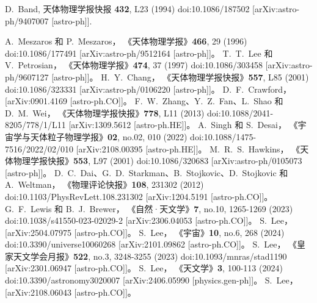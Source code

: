 \documentclass[jkps,preprint,fleqn]{revtex4}
\begin{document}
\begin{CJK*}{UTF8}{gbsn}
\begin{thebibliography}{999}
D.~Band,  
天体物理学报快报 \textbf{432}, L23 (1994)  
doi:10.1086/187502  
[arXiv:astro-ph/9407007 [astro-ph]].  

A.~Meszaros 和 P.~Meszaros，
《天体物理学报》\textbf{466}, 29 (1996)
doi:10.1086/177491
[arXiv:astro-ph/9512164 [astro-ph]]。
T.~T.~Lee 和 V.~Petrosian，
《天体物理学报》\textbf{474}, 37 (1997)
doi:10.1086/303458
[arXiv:astro-ph/9607127 [astro-ph]]。
H.~Y.~Chang，
《天体物理学报快报》\textbf{557}, L85 (2001)
doi:10.1086/323331
[arXiv:astro-ph/0106220 [astro-ph]]。
D.~F.~Crawford，
[arXiv:0901.4169 [astro-ph.CO]]。
F.~W.~Zhang、Y.~Z.~Fan、L.~Shao 和 D.~M.~Wei，
《天体物理学报快报》\textbf{778}, L11 (2013)
doi:10.1088/2041-8205/778/1/L11
[arXiv:1309.5612 [astro-ph.HE]]。
A.~Singh 和 S.~Desai，
《宇宙学与天体粒子物理学报》\textbf{02}, no.02, 010 (2022)
doi:10.1088/1475-7516/2022/02/010
[arXiv:2108.00395 [astro-ph.HE]]。
M.~R.~S.~Hawkins，
《天体物理学报快报》\textbf{553}, L97 (2001)
doi:10.1086/320683
[arXiv:astro-ph/0105073 [astro-ph]]。
D.~C.~Dai、G.~D.~Starkman、B.~Stojkovic、D.~Stojkovic 和 A.~Weltman，
《物理评论快报》\textbf{108}, 231302 (2012)
doi:10.1103/PhysRevLett.108.231302
[arXiv:1204.5191 [astro-ph.CO]]。
G.~F.~Lewis 和 B.~J.~Brewer，
《自然·天文学》\textbf{7}, no.10, 1265-1269 (2023)
doi:10.1038/s41550-023-02029-2
[arXiv:2306.04053 [astro-ph.CO]]。
S.~Lee，
[arXiv:2504.07975 [astro-ph.CO]]。
S.~Lee，
《宇宙》\textbf{10}, no.6, 268 (2024)
doi:10.3390/universe10060268
[arXiv:2101.09862 [astro-ph.CO]]。
S.~Lee，
《皇家天文学会月报》\textbf{522}, no.3, 3248-3255 (2023)
doi:10.1093/mnras/stad1190
[arXiv:2301.06947 [astro-ph.CO]]。
S.~Lee，
《天文学》\textbf{3}, 100-113 (2024)
doi:10.3390/astronomy3020007
[arXiv:2406.05990 [physics.gen-ph]]。
S.~Lee，
[arXiv:2108.06043 [astro-ph.CO]]。
\end{thebibliography}
\end{CJK*}
\end{document}
